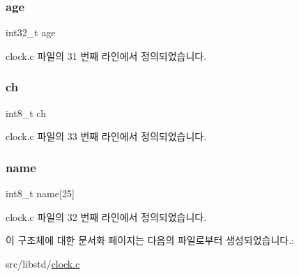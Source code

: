 \subsubsection{\texorpdfstring{age}{age}}
{\footnotesize\ttfamily int32\+\_\+t age}



clock.\+c 파일의 31 번째 라인에서 정의되었습니다.

\mbox{\label{structdata__st_a6c669ea96fcb54a44ce1d6adf7969d80}} 
\subsubsection{\texorpdfstring{ch}{ch}}
{\footnotesize\ttfamily int8\+\_\+t ch}



clock.\+c 파일의 33 번째 라인에서 정의되었습니다.

\mbox{\label{structdata__st_aa6a4a36f30f93c1588dccd3030f66c37}} 
\subsubsection{\texorpdfstring{name}{name}}
{\footnotesize\ttfamily int8\+\_\+t name\mbox{[}25\mbox{]}}



clock.\+c 파일의 32 번째 라인에서 정의되었습니다.



이 구조체에 대한 문서화 페이지는 다음의 파일로부터 생성되었습니다.\+:\begin{DoxyCompactItemize}
\item 
src/libstd/\hyperlink{clock_8c}{clock.\+c}\end{DoxyCompactItemize}
